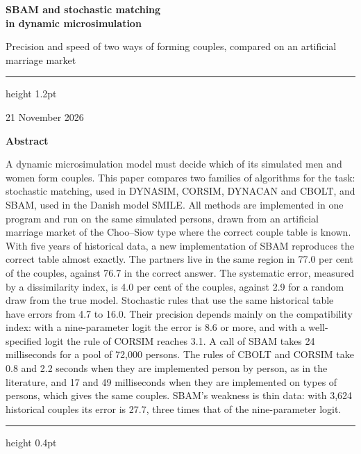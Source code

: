 \documentclass[12pt,a4paper]{article}
\begin{document}
\thispagestyle{plain}

{\raggedright
{\sffamily\bfseries\LARGE\color{accent}SBAM and stochastic matching\\ in dynamic microsimulation\par}
\vspace{6pt}
{\sffamily\large\color{black!70}Precision and speed of two ways of forming couples, compared on an artificial marriage market\par}
\vspace{10pt}
{\color{accent}\hrule height 1.2pt}
\vspace{8pt}
{\sffamily\small\color{black!60}21 November 2026\par}
}
\vspace{1.4em}

{\sffamily\bfseries\color{accent}Abstract\par}
\vspace{-2pt}
{\small
A dynamic microsimulation model must decide which of its simulated men and women form couples.
This paper compares two families of algorithms for the task: stochastic matching, used in
DYNASIM, CORSIM, DYNACAN and CBOLT, and SBAM, used in the Danish model SMILE. All methods are
implemented in one program and run on the same simulated persons, drawn from an artificial
marriage market of the Choo--Siow type where the correct couple table is known. With five years
of historical data, a new implementation of SBAM reproduces the correct table almost exactly. The
partners live in the same region in 77.0 per cent of the couples, against 76.7 in the correct
answer. The systematic error, measured by a dissimilarity index, is 4.0 per cent of the couples,
against 2.9 for a random draw from the true model. Stochastic rules that use the same historical
table have errors from 4.7 to 16.0. Their precision depends mainly on the compatibility index:
with a nine-parameter logit the error is 8.6 or more, and with a well-specified logit the rule of
CORSIM reaches 3.1. A call of SBAM takes 24 milliseconds for a pool of 72,000 persons. The rules
of CBOLT and CORSIM take 0.8 and 2.2 seconds when they are implemented person by person, as in
the literature, and 17 and 49 milliseconds when they are implemented on types of persons, which
gives the same couples. SBAM's weakness is thin data: with 3,624 historical couples its error is
27.7, three times that of the nine-parameter logit.
\par}
\vspace{4pt}
{\color{black!25}\hrule height 0.4pt}
\vspace{0.4em}
\end{document}

